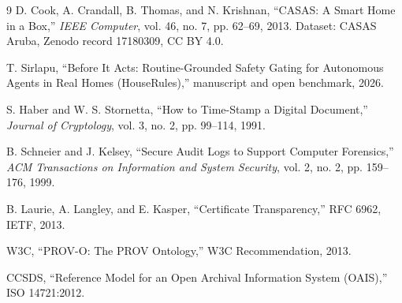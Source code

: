 \documentclass[journal]{IEEEtran}
\begin{document}
\begin{thebibliography}{9}
 D. Cook, A. Crandall, B. Thomas, and N. Krishnan,
``CASAS: A Smart Home in a Box,'' \emph{IEEE Computer}, vol. 46,
no. 7, pp. 62--69, 2013. Dataset: CASAS Aruba, Zenodo record
17180309, CC BY 4.0.

 T. Sirlapu, ``Before It Acts: Routine-Grounded
Safety Gating for Autonomous Agents in Real Homes (HouseRules),''
manuscript and open benchmark, 2026.

 S. Haber and W. S. Stornetta, ``How to Time-Stamp a
Digital Document,'' \emph{Journal of Cryptology}, vol. 3, no. 2,
pp. 99--114, 1991.

 B. Schneier and J. Kelsey, ``Secure Audit Logs to
Support Computer Forensics,'' \emph{ACM Transactions on Information
and System Security}, vol. 2, no. 2, pp. 159--176, 1999.

 B. Laurie, A. Langley, and E. Kasper, ``Certificate
Transparency,'' RFC 6962, IETF, 2013.

 W3C, ``PROV-O: The PROV Ontology,'' W3C Recommendation,
2013.

 CCSDS, ``Reference Model for an Open Archival
Information System (OAIS),'' ISO 14721:2012.
\end{thebibliography}
\end{document}
